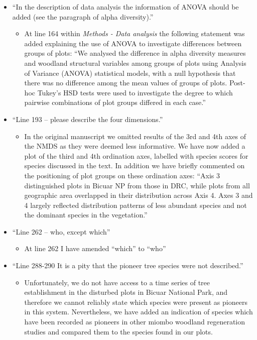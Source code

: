 \documentclass[a4paper]{letter}
\begin{document}
\begin{letter}{}
\begin{itemize}
\begin{itemize}
		\end{itemize}
	\item{``In the description of data analysis the information of ANOVA should be added (see the paragraph of alpha diversity).''}
		\begin{itemize}
			\item{At line 164 within \textit{Methods - Data analysis} the following statement was added explaining the use of ANOVA to investigate differences between groups of plots: ``We analysed the difference in alpha diversity measures and woodland structural variables among groups of plots using Analysis of Variance (ANOVA) statistical models, with a null hypothesis that there was no difference among the mean values of groups of plots. Post-hoc Tukey's HSD tests were used to investigate the degree to which pairwise combinations of plot groups differed in each case.''}
		\end{itemize}
	\item{``Line 193 – please describe the four dimensions.''}
		\begin{itemize}
			\item{In the original manuscript we omitted results of the 3rd and 4th axes of the NMDS as they were deemed less informative. We have now added a plot of the third and 4th ordination axes, labelled with species scores for species discussed in the text. In addition we have briefly commented on the positioning of plot groups on these ordination axes: ``Axis 3 distinguished plots in Bicuar NP from those in DRC, while plots from all geographic area overlapped in their distribution across Axis 4. Axes 3 and 4 largely reflected distribution patterns of less abundant species and not the dominant species in the vegetation.''}
		\end{itemize}
	\item{``Line 262 – who, except which''}
		\begin{itemize}
			\item{At line 262 I have amended ``which'' to ``who''}
		\end{itemize}
	\item{``Line 288-290 It is a pity that the pioneer tree species were not described.''}
		\begin{itemize}
			\item{Unfortunately, we do not have access to a time series of tree establishment in the disturbed plots in Bicuar National Park, and therefore we cannot reliably state which species were present as pioneers in this system. Nevertheless, we have added an indication of species which have been recorded as pioneers in other miombo woodland regeneration studies and compared them to the species found in our plots.}

\end{itemize}
\end{itemize}
\end{letter}
\end{document}
